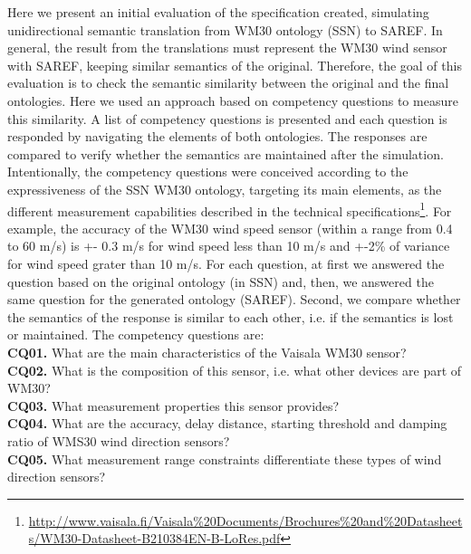 \documentclass{sig-alternate-05-2015}
\begin{document}
Here we present an initial evaluation of the specification created, simulating unidirectional semantic translation from WM30 ontology (SSN) to SAREF. In general, the result from the translations must represent the WM30 wind sensor with SAREF, keeping similar semantics of the original. Therefore, the goal of this evaluation is to check the semantic similarity between the original and the final ontologies. Here we used an approach based on competency questions to measure this similarity. A list of competency questions is presented and each question is responded by navigating the elements of both ontologies. The responses are compared to verify whether the semantics are maintained after the simulation. Intentionally, the competency questions were conceived according to the expressiveness of the SSN WM30 ontology, targeting its main elements, as the different measurement capabilities described in the technical specifications\footnote{\url{http://www.vaisala.fi/Vaisala\%20Documents/Brochures\%20and\%20Datasheets/WM30-Datasheet-B210384EN-B-LoRes.pdf}}. For example, the accuracy of the WM30 wind speed sensor (within a range from 0.4 to 60 m/s) is +- 0.3 m/s for wind speed less than 10 m/s and +-2\% of variance for wind speed grater than 10 m/s. For each question, at first we answered the question based on the original ontology (in SSN) and, then, we answered the same question for the generated ontology (SAREF). Second, we compare whether the semantics of the response is similar to each other, i.e. if the semantics is lost or maintained. The competency questions are: 
\\\textbf{CQ01.} What are the main characteristics of the Vaisala WM30 sensor? 
\\\textbf{CQ02.} What is the composition of this sensor, i.e. what other devices are part of WM30?
\\\textbf{CQ03.} What measurement properties this sensor provides?
\\\textbf{CQ04.} What are the accuracy, delay distance, starting threshold and damping ratio of WMS30 wind direction sensors? 
\\\textbf{CQ05.} What measurement range constraints differentiate these types of wind direction sensors?
\end{document}
